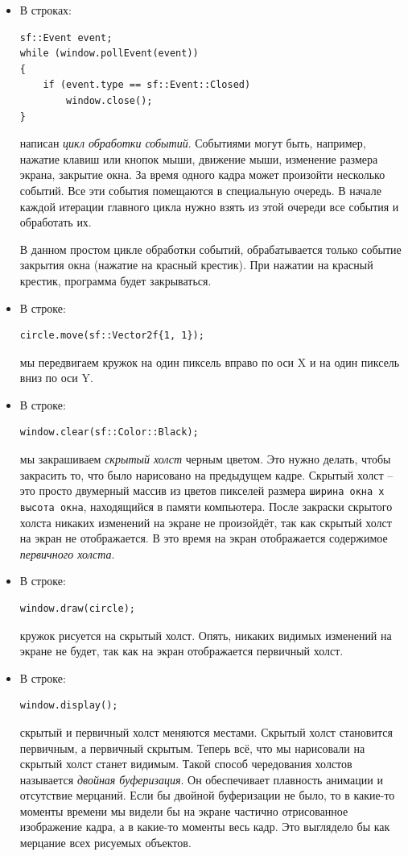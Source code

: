 \documentclass{article}
\begin{document}
\begin{itemize}
\item В строках:
\begin{lstlisting}[frame=none]
sf::Event event;
while (window.pollEvent(event)) 
{
    if (event.type == sf::Event::Closed)
        window.close();
}
\end{lstlisting}
написан \textit{цикл обработки событий}. Событиями могут быть, например, нажатие клавиш или кнопок мыши, движение мыши, изменение размера экрана, закрытие окна. За время одного кадра может произойти несколько событий. Все эти события помещаются в специальную очередь. В начале каждой итерации главного цикла нужно взять из этой очереди все события и обработать их.

В данном простом цикле обработки событий, обрабатывается только событие закрытия окна (нажатие на красный крестик). При нажатии на красный крестик, программа будет закрываться.

\item В строке:
\begin{lstlisting}[frame=none]
circle.move(sf::Vector2f{1, 1});
\end{lstlisting}
мы передвигаем кружок на один пиксель вправо по оси X и на один пиксель вниз по оси Y.

\item В строке:
\begin{lstlisting}[frame=none]
window.clear(sf::Color::Black);
\end{lstlisting}
мы закрашиваем \textit{скрытый холст} черным цветом. Это нужно делать, чтобы закрасить то, что было нарисовано на предыдущем кадре. Скрытый холст -- это просто двумерный массив из цветов пикселей размера \texttt{ширина окна x высота окна}, находящийся в памяти компьютера. После закраски скрытого холста никаких изменений на экране не произойдёт, так как скрытый холст на экран не отображается. В это время на экран отображается содержимое \textit{первичного холста}.


\item В строке:
\begin{lstlisting}[frame=none]
window.draw(circle);
\end{lstlisting}
кружок рисуется на скрытый холст. Опять, никаких видимых изменений на экране не будет, так как на экран отображается первичный холст.

\item В строке:
\begin{lstlisting}[frame=none]
window.display();
\end{lstlisting}
скрытый и первичный холст меняются местами. Скрытый холст становится первичным, а первичный скрытым. Теперь всё, что мы нарисовали на скрытый холст станет видимым. Такой способ чередования холстов называется \textit{двойная буферизация}. Он обеспечивает плавность анимации и отсутствие мерцаний. Если бы двойной буферизации не было, то в какие-то моменты времени мы видели бы на экране частично отрисованное изображение кадра, а в какие-то моменты весь кадр. Это выглядело бы как мерцание всех рисуемых объектов.



\end{itemize}
\newpage
\end{document}
